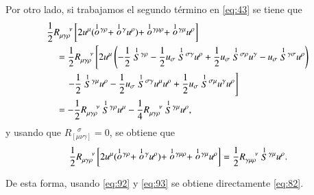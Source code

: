 Por otro lado, si trabajamos el segundo t\'ermino en \eqref{eq:43} se tiene que
\begin{align}
& \frac{1}{2} R^{\ \ \ \ \nu}_{\mu \gamma \rho} \left[ 2u^{\mu}(\des{1}{o}^{\gamma \rho} + \des{1}{o}^{\gamma} u^{\rho}) + \des{1}{o}^{\gamma \mu \rho} + \des{1}{o}^{\gamma \mu}  u^{\rho}  \right] \nonumber \\
& \quad = \frac{1}{2} R^{\ \ \ \ \nu}_{\mu \gamma \rho} \left[ 2 u^{\mu} \left( -\frac{1}{2} \des{1}{S}^{\gamma \rho} - \frac{1}{2} u_{\sigma} \des{1}{S}^{\sigma \gamma} u^{\rho} + \frac{1}{2} u_{\sigma} \des{1}{S}^{\sigma \rho} u^{\gamma} - u_{\sigma} \des{1}{S}^{\gamma \sigma} u^{\rho} \right) \right. \nonumber \\
&\qquad \left. - \frac{1}{2} \des{1}{S}^{\gamma \mu} u^{\rho} - \frac{1}{2} u_{\sigma} \des{1}{S}^{\sigma \gamma} u^{\mu} u^{\rho} + \frac{1}{2} u_{\sigma} \des{1}{S}^{\sigma \mu} u^{\gamma} u^{\rho}  \right] \nonumber\\
& \quad = - \frac{1}{2} R^{\ \ \ \ \nu}_{\mu \gamma \rho} \des{1}{S}^{\gamma \rho} u^{\mu} - \frac{1}{4} R^{\ \ \ \ \nu}_{\mu \gamma \rho} \des{1}{S}^{\gamma \mu} u^{\rho}, \nonumber
\end{align}
y usando que $R_{[\mu \nu \gamma]}^{\ \ \ \ \sigma} = 0$, se obtiene que
\begin{equation}
\label{eq:93}
\frac{1}{2} R^{\ \ \ \ \nu}_{\mu \gamma \rho} \left[ 2u^{\mu}(\stackrel{1}{o}{\!}^{\gamma \rho} + \stackrel{1}{o}{\!}^{\gamma} u^{\rho}) + \stackrel{1}{o}{\!}^{\gamma \mu \rho} + \stackrel{1}{o}{\!}^{\gamma \mu}  u^{\rho} \right] = \frac{1}{2} R^{\ \ \ \ \nu}_{\gamma \mu \rho} \stackrel{1}{S}{\!}^{\gamma \mu} u^{\rho}.
\end{equation}

De esta forma, usando \eqref{eq:92} y \eqref{eq:93} se obtiene directamente \eqref{eq:82}.


